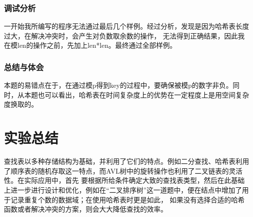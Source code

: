\documentclass[a4paper,11pt]{article}%
\begin{document}
\subsubsection{调试分析}
一开始我所编写的程序无法通过最后几个样例。经过分析，发现是因为哈希表长度过大，在解决冲突时，会产生对负数取余数的操作，
无法得到正确结果，因此我在模len的操作之前，先加上len*len。最终通过全部样例。
\subsubsection{总结与体会}
本题的易错点在于，在通过模p得到key的过程中，要确保被模p的数字非负。同时，从本题也可以看出，哈希表在时间复杂度上的优势在一定程度上是用空间复杂度换取的。
\section{实验总结}
查找表以多种存储结构为基础，并利用了它们的特点。例如二分查找、哈希表利用了顺序表的随机存取这一特点，而AVL树中的旋转操作也利用了二叉链表的灵活性。在实际应用中，首先
要根据所给条件确定大致的查找表类型，然后在此基础上进一步进行设计和优化，例如在“二叉排序树”这一道题中，便在结点中增加了用于记录重复个数的数据域；在使用哈希表时更是如此，
如果没有选择合适的哈希函数或者解决冲突的方案，则会大大降低查找的效率。
\end{document}
